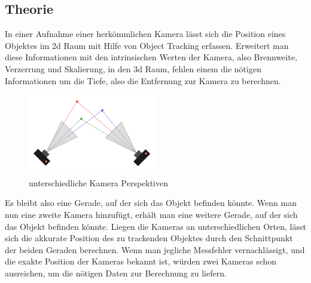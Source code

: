 \documentclass[12pt]{article}
\begin{document}
\subsection{Theorie}
In einer Aufnahme einer herkömmlichen Kamera lässt sich die Position eines Objektes im 2d Raum mit Hilfe von Object Tracking erfassen. Erweitert man diese Informationen mit den intrinsischen Werten der Kamera, also Brennweite, Verzerrung und Skalierung, in den 3d Raum, fehlen einem die nötigen Informationen um die Tiefe, also die Entfernung zur Kamera zu berechnen.  

\begin{figure}
\centering
  \includegraphics[angle=0,width=\linewidth]{triangulation.png}
  \caption{unterschiedliche Kamera Perspektiven}
\end{figure}
Es bleibt also eine Gerade, auf der sich das Objekt befinden könnte. Wenn man nun eine zweite Kamera hinzufügt, erhält man eine weitere Gerade, auf der sich das Objekt befinden könnte. Liegen die Kameras an unterschiedlichen Orten, lässt sich die akkurate Position des zu trackenden Objektes durch den Schnittpunkt der beiden Geraden berechnen. Wenn man jegliche Messfehler vernachlässigt, und die exakte Position der Kameras bekannt ist, würden zwei Kameras schon ausreichen, um die nötigen Daten zur Berechnung zu liefern.  
\end{document}
